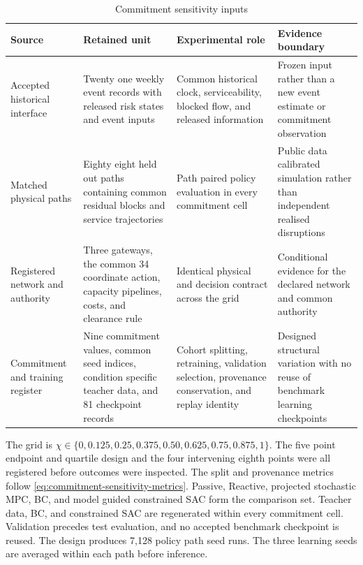 \documentclass[a4paper,fleqn]{cas-sc}
\begin{document}
\begingroup
\setlength{\tabcolsep}{4pt}
\begin{table}[t]
\centering
\caption{Commitment sensitivity inputs}
\label{tab:531-commitment-inputs}
\begin{tabular}{>{\RaggedRight\arraybackslash}p{}
                >{\RaggedRight\arraybackslash}p{}
                >{\RaggedRight\arraybackslash}p{}
                >{\RaggedRight\arraybackslash}p{}}
\toprule
Source & Retained unit & Experimental role & Evidence boundary \\
\midrule
Accepted historical interface
& Twenty one weekly event records with released risk states and event inputs
& Common historical clock, serviceability, blocked flow, and released information
& Frozen input rather than a new event estimate or commitment observation \\
Matched physical paths
& Eighty eight held out paths containing common residual blocks and service trajectories
& Path paired policy evaluation in every commitment cell
& Public data calibrated simulation rather than independent realised disruptions \\
Registered network and authority
& Three gateways, the common 34 coordinate action, capacity pipelines, costs, and clearance rule
& Identical physical and decision contract across the grid
& Conditional evidence for the declared network and common authority \\
Commitment and training register
& Nine commitment values, common seed indices, condition specific teacher data, and 81 checkpoint records
& Cohort splitting, retraining, validation selection, provenance conservation, and replay identity
& Designed structural variation with no reuse of benchmark learning checkpoints \\
\bottomrule
\end{tabular}
\end{table}
\endgroup

The grid is
$\chi\in\{0,0.125,0.25,0.375,0.50,0.625,0.75,0.875,1\}$. The five point
endpoint and quartile design and the four intervening eighth points were all
registered before outcomes were inspected. The split and provenance metrics
follow \cref{eq:commitment-sensitivity-metrics}. Passive, Reactive, projected
stochastic MPC, BC, and model guided constrained SAC form the comparison set.
Teacher data, BC, and constrained SAC are regenerated within every commitment
cell. Validation precedes test evaluation, and no accepted benchmark checkpoint
is reused. The design produces 7,128 policy path seed runs. The three learning
seeds are averaged within each path before inference.
\end{document}
